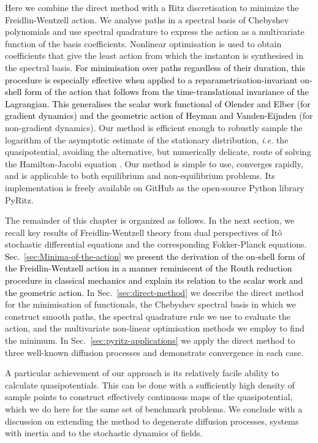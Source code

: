 Here we combine the direct method with a Ritz discretisation \citep{ritz1909uber,gelfand2012calculus,kantorovich1958approximate}
to minimize the Freidlin-Wentzell action. We analyse paths in a spectral
basis of Chebyshev polynomials and use spectral quadrature to express
the action as a multivariate function of the basis coefficients. Nonlinear
optimisation is used to obtain coefficients that give the least action
from which the instanton is synthesised in the spectral basis.\textcolor{black}{{}
For minimisation over paths regardless of their duration, this procedure
is especially effective when applied to a reparametrisation-invariant
on-shell form of the action that follows from the time-translational
invariance of the Lagrangian. This generalises the scalar work functional
of Olender and Elber (for gradient dynamics) and the geometric action
of Heyman and Vanden-Eijnden} \citep{vanden2008geometric} (for non-gradient
dynamics). Our method is efficient enough to robustly sample the logarithm
of the asymptotic estimate of the stationary distribution, \emph{i.e.
}the quasipotential, avoiding the alternative, but numerically delicate,
route of solving the Hamilton-Jacobi equation \citep{cameron2012finding,yang2019computing,dahiya2018ordered}.
Our method is simple to use, converges rapidly, and is applicable
to both equilibrium and non-equilibrium problems. Its implementation
is freely available on GitHub as the open-source Python library PyRitz. 

The remainder of this chapter is organized as follows. In the next section,
we recall key results of Freidlin-Wentzell theory from dual perspectives
of Itô stochastic differential equations and the corresponding Fokker-Planck
equations.\textcolor{black}{{} Sec.~\ref{sec:Minima-of-the-action}
we present the derivation of the on-shell form of the Freidlin-Wentzell
action in a manner reminiscent of the Routh reduction procedure in
classical mechanics and explain its relation to the scalar work and
the geometric action. }In Sec.~\ref{sec:direct-method} we describe
the direct method for the minimisation of functionals, the Chebyshev
spectral basis in which we construct smooth paths, the spectral quadrature
rule we use to evaluate the action, and the multivariate non-linear
optimisation methods we employ to find the minimum. In Sec.~\ref{sec:pyritz-applications}
we apply the direct method to three well-known diffusion processes
and demonstrate convergence in each case. 

A particular achievement of our approach is its relatively facile
ability to calculate quasipotentials. This can be done with a sufficiently
high density of sample points to construct effectively continuous
maps of the quasipotential, which we do here for the same set of benchmark
problems. We conclude with a discussion on extending the method to
degenerate diffusion processes, systems with inertia and to the stochastic
dynamics of fields. 

